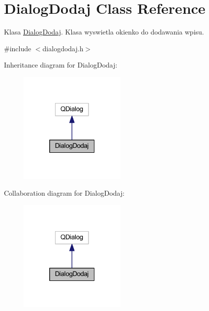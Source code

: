 \hypertarget{class_dialog_dodaj}{}\section{Dialog\+Dodaj Class Reference}
\label{class_dialog_dodaj}


Klasa \hyperlink{class_dialog_dodaj}{Dialog\+Dodaj}. Klasa wyswietla okienko do dodawania wpisu.  




{\ttfamily \#include $<$dialogdodaj.\+h$>$}



Inheritance diagram for Dialog\+Dodaj\+:\nopagebreak
\begin{figure}[H]
\begin{center}
\leavevmode
\includegraphics[width=148pt]{class_dialog_dodaj__inherit__graph}
\end{center}
\end{figure}


Collaboration diagram for Dialog\+Dodaj\+:\nopagebreak
\begin{figure}[H]
\begin{center}
\leavevmode
\includegraphics[width=148pt]{class_dialog_dodaj__coll__graph}
\end{center}
\end{figure}
